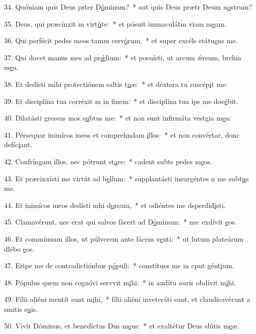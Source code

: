 34. Quóniam quis Deus prter D\uline{ó}minum?~* aut quis Deus prætr Deum n\uline{o}strum?\par 
35. Deus, qui præcínxit m virt\uline{ú}te:~* et pósuit immaculátm viam m\uline{e}am.\par 
36. Qui perfécit pedes meos tamm cerv\uline{ó}rum,~* et super excéls státu\uline{e}ns me.\par 
37. Qui docet manus mes ad pr\uline{ǽ}lium:~* et posuísti, ut arcum ǽreum, brchia m\uline{e}a.\par 
38. Et dedísti mihi protectiónem saltis t\uline{u}æ:~* et déxtera tu suscép\uline{i}t me:\par 
39. Et disciplína tua corréxit m in f\uline{i}nem:~* et disciplína tua ips me doc\uline{é}bit.\par 
40. Dilatásti gressus mos s\uline{u}btus me:~* et non sunt infirmáta vestgia m\uline{e}a:\par 
41. Pérsequar inimícos meos et comprehndam \uline{i}llos:~* et non convértar, donc defíc\uline{i}ant.\par 
42. Confríngam illos, nec pótrunt st\uline{a}re:~* cadent subts pedes m\uline{e}os.\par 
43. Et præcinxísti me virtút ad b\uline{e}llum:~* supplantásti insurgéntes n me subt\uline{u}s me.\par 
44. Et inimícos meos dedísti mhi d\uline{o}rsum,~* et odiéntes me dsperdid\uline{í}sti.\par 
45. Clamavérunt, nec erat qui salvos fácert ad D\uline{ó}minum:~* nec exdívit \uline{e}os.\par 
46. Et commínuam illos, ut púlverem ante fácem v\uline{e}nti:~* ut lutum plateárum dlébo \uline{e}os.\par 
47. Eripe me de contradictiónbus p\uline{ó}puli:~* constítues me in cput gént\uline{i}um.\par 
48. Pópulus quem non cognóvi servvit m\uline{i}hi:~* in audítu auris obdívit m\uline{i}hi.\par 
49. Fílii aliéni mentít sunt m\uline{i}hi,~* fílii aliéni inveteráti sunt, et claudicavérunt a smitis s\uline{u}is.\par 
50. Vivit Dóminus, et benedíctus Dus m\uline{e}us:~* et exaltétur Deus slútis m\uline{e}æ.\par 
